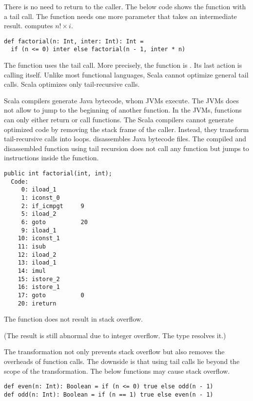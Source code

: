 There is no need to return to the caller. The below code shows the
 function with a tail call. The function needs one more parameter
that takes an intermediate result.  computes \(n!\times
i\).

\begin{verbatim}
def factorial(n: Int, inter: Int): Int =
  if (n <= 0) inter else factorial(n - 1, inter * n)
\end{verbatim}

The function uses the tail call. More precisely, the function is
. Its last action is calling itself. Unlike most functional
languages, Scala cannot optimize general tail calls. Scala optimizes only
tail-recursive calls.

Scala compilers generate Java bytecode, whom JVMs execute. The JVMs does not
allow to jump to the beginning of another function. In the JVMs, functions can
only either return or call functions. The Scala compilers cannot generate
optimized code by removing the stack frame of the caller. Instead, they transform
tail-recursive calls into loops.  disassembles Java bytecode files.
The compiled and disassembled  function using tail recursion does
not call any function but jumps to instructions inside the function.

\begin{verbatim}
public int factorial(int, int);
  Code:
     0: iload_1
     1: iconst_0
     2: if_icmpgt     9
     5: iload_2
     6: goto          20
     9: iload_1
    10: iconst_1
    11: isub
    12: iload_2
    13: iload_1
    14: imul
    15: istore_2
    16: istore_1
    17: goto          0
    20: ireturn
\end{verbatim}

The function does not result in stack overflow.

(The result is still abnormal due to integer overflow. The  type
resolves it.)

The transformation not only prevents stack overflow but also removes the
overheads of function calls. The downside is that  using tail calls lie beyond the scope of the transformation. The below
functions may cause stack overflow.

\begin{verbatim}
def even(n: Int): Boolean = if (n <= 0) true else odd(n - 1)
def odd(n: Int): Boolean = if (n == 1) true else even(n - 1)
\end{verbatim}

